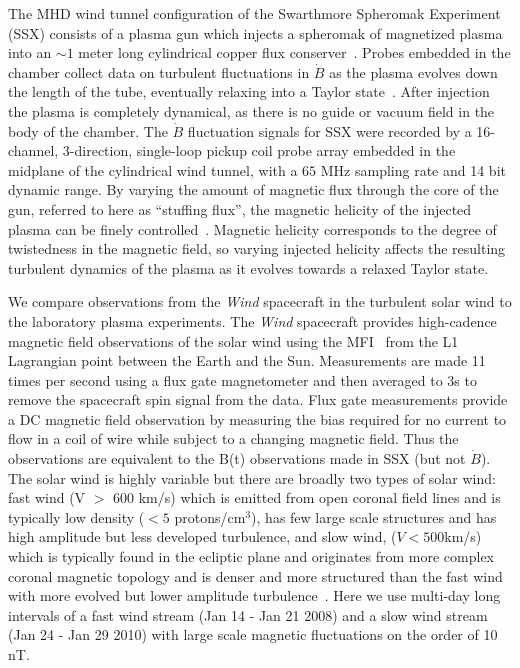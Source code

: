 \documentclass[aps,prx,twocolumn,secnumarabic,nobalancelastpage,amsmath,amssymb,
nofootinbib]{revtex4-1}
\begin{document}
The MHD wind tunnel configuration of the Swarthmore Spheromak Experiment (SSX) consists of a plasma gun which injects a spheromak of magnetized plasma into an $\sim1$ meter long cylindrical copper flux conserver~\cite{gray2013}. Probes embedded in the chamber collect data on turbulent fluctuations in $\dot{B}$ as the plasma evolves down the length of the tube, eventually relaxing into a Taylor state~\cite{gray2013,schaffner2014a,schaffner2014b,schaffner2014c}. After injection the plasma is completely dynamical, as there is no guide or vacuum field in the body of the chamber. The $\dot{B}$ fluctuation signals for SSX  were recorded by a 16-channel, 3-direction, single-loop pickup coil probe array embedded in the midplane of the cylindrical wind tunnel, with a $65$ MHz sampling rate and 14 bit dynamic range. By varying the amount of magnetic flux through the core of the gun, referred to here as ``stuffing flux'', the magnetic helicity of the injected plasma can be finely controlled~\cite{schaffner2014b}. Magnetic helicity corresponds to the degree of twistedness in the magnetic field, so varying injected helicity affects the resulting turbulent dynamics of the plasma as it evolves towards a relaxed Taylor state. 

We compare observations from the {\it Wind} spacecraft in the turbulent solar wind to the laboratory plasma experiments. The {\it Wind} spacecraft provides high-cadence magnetic field observations of the solar wind using the MFI~\cite{lepping1995} from the L1 Lagrangian point between the Earth and the Sun. Measurements are made 11 times per second using a flux gate magnetometer and then averaged to 3s to remove the spacecraft spin signal from the data. Flux gate measurements provide a DC magnetic field observation by measuring the bias required for no current to flow in a coil of wire while subject to a changing magnetic field. Thus the observations are equivalent to the B(t) observations made in SSX (but not $\dot{B}$). The solar wind is highly variable but there are broadly two types of solar wind: fast wind (V $>$ 600 km/s) which is emitted from open coronal field lines and is typically low density ($< 5$ protons/cm$^3$), has few large scale structures and has high amplitude but less developed turbulence, and slow wind, ($V < 500 $km/s) which is typically found in the ecliptic plane and originates from more complex coronal magnetic topology and is denser and more structured than the fast wind with more evolved but lower amplitude turbulence~\cite{tu1990,bruno2013}. Here we use multi-day long intervals of a fast wind stream (Jan 14 - Jan 21 2008) and a slow wind stream (Jan 24 - Jan 29 2010) with large scale magnetic fluctuations on the order of 10 nT. 
\end{document}
